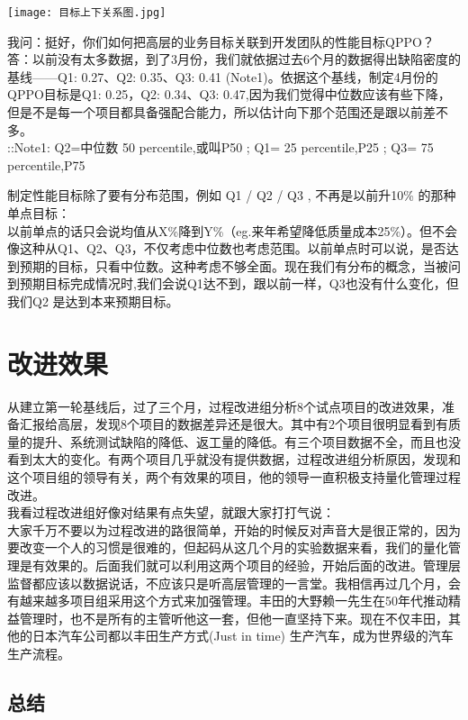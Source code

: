 \texttt{[image: 目标上下关系图.jpg]}

我问：挺好，你们如何把高层的业务目标关联到开发团队的性能目标QPPO？\\
答：以前没有太多数据，到了3月份，我们就依据过去6个月的数据得出缺陷密度的基线------Q1:
0.27、Q2: 0.35、Q3: 0.41 (Note1)。依据这个基线，制定4月份的QPPO目标是Q1:
0.25，Q2: 0.34、Q3:
0.47,因为我们觉得中位数应该有些下降，但是不是每一个项目都具备强配合能力，所以估计向下那个范围还是跟以前差不多。\\
::Note1: Q2=中位数 50 percentile,或叫P50 ; Q1= 25 percentile,P25 ; Q3=
75 percentile,P75

制定性能目标除了要有分布范围，例如 Q1 / Q2 / Q3 , 不再是以前升10\%
的那种单点目标：\\
以前单点的话只会说均值从X\%降到Y\%（eg.来年希望降低质量成本25\%）。但不会像这种从Q1、Q2、Q3，不仅考虑中位数也考虑范围。以前单点时可以说，是否达到预期的目标，只看中位数。这种考虑不够全面。现在我们有分布的概念，当被问到预期目标完成情况时,我们会说Q1达不到，跟以前一样，Q3也没有什么变化，但我们Q2
是达到本来预期目标。\\

\hypertarget{ux6539ux8fdbux6548ux679c}{%
\section{改进效果}\label{ux6539ux8fdbux6548ux679c}}

从建立第一轮基线后，过了三个月，过程改进组分析8个试点项目的改进效果，准备汇报给高层，发现8个项目的数据差异还是很大。其中有2个项目很明显看到有质量的提升、系统测试缺陷的降低、返工量的降低。有三个项目数据不全，而且也没看到太大的变化。有两个项目几乎就没有提供数据，过程改进组分析原因，发现和这个项目组的领导有关，两个有效果的项目，他的领导一直积极支持量化管理过程改进。\\
我看过程改进组好像对结果有点失望，就跟大家打打气说：\\
大家千万不要以为过程改进的路很简单，开始的时候反对声音大是很正常的，因为要改变一个人的习惯是很难的，但起码从这几个月的实验数据来看，我们的量化管理是有效果的。后面我们就可以利用这两个项目的经验，开始后面的改进。管理层监督都应该以数据说话，不应该只是听高层管理的一言堂。我相信再过几个月，会有越来越多项目组采用这个方式来加强管理。丰田的大野赖一先生在50年代推动精益管理时，也不是所有的主管听他这一套，但他一直坚持下来。现在不仅丰田，其他的日本汽车公司都以丰田生产方式(Just
in time) 生产汽车，成为世界级的汽车生产流程。\\

\hypertarget{ux603bux7ed3}{%
\subsection{总结}\label{ux603bux7ed3}}

